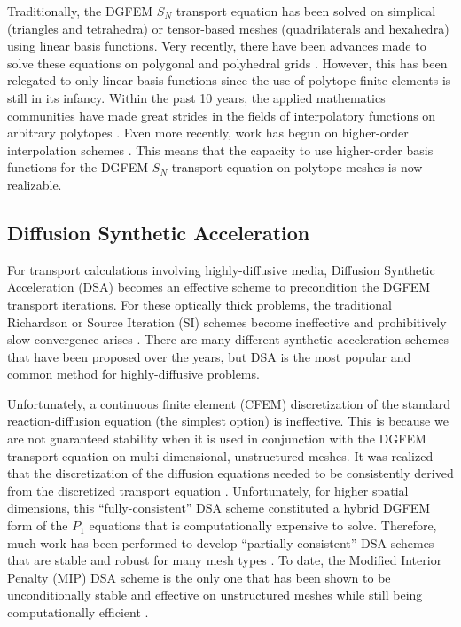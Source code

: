 Traditionally, the DGFEM $S_N$ transport equation has been solved on simplical (triangles and tetrahedra) or tensor-based meshes (quadrilaterals and hexahedra) using linear basis functions. Very recently, there have been advances made to solve these equations on polygonal and polyhedral grids \cite{davidson2008finite,ref::PWLD_stone_adams,ref::PWLD_stone_adams_unstructured,bailey2008phd}. However, this has been relegated to only linear basis functions since the use of polytope finite elements is still in its infancy. Within the past 10 years, the applied mathematics communities have made great strides in the fields of interpolatory functions on arbitrary polytopes \cite{sukumar2006recent}. Even more recently, work has begun on higher-order interpolation schemes \cite{rand2013interpolation}. This means that the capacity to use higher-order basis functions for the DGFEM $S_N$ transport equation on polytope meshes is now realizable. 

\subsection{Diffusion Synthetic Acceleration}
\label{sec::Intro_Past_DSA}

For transport calculations involving highly-diffusive media, Diffusion Synthetic Acceleration (DSA) becomes an effective scheme to precondition the DGFEM transport iterations. For these optically thick problems, the traditional Richardson or Source Iteration (SI) schemes become ineffective and prohibitively slow convergence arises \cite{ref::adams_larsen_iter_methods}. There are many different synthetic acceleration schemes that have been proposed over the years, but DSA is the most popular and common method for highly-diffusive problems.

Unfortunately, a continuous finite element (CFEM) discretization of the standard reaction-diffusion equation (the simplest option) is ineffective. This is because we are not guaranteed stability when it is used in conjunction with the DGFEM transport equation on multi-dimensional, unstructured meshes. It was realized that the discretization of the diffusion equations needed to be consistently derived from the discretized transport equation \cite{alcouffe1976stable,alcouffe1977DSA,larsen1982unconditionally_I,larsen1982unconditionally_II,warsa2002fully}. Unfortunately, for higher spatial dimensions, this ``fully-consistent'' DSA scheme constituted a hybrid DGFEM form of the $P_1$ equations that is computationally expensive to solve. Therefore, much work has been performed to develop ``partially-consistent'' DSA schemes that are stable and robust for many mesh types \cite{ref::dsa_DFEM_adams_martin,wareing1991diffusion,ref::DSA_wang_ragusa}. To date, the Modified Interior Penalty (MIP) DSA scheme is the only one that has been shown to be unconditionally stable and effective on unstructured meshes while still being computationally efficient \cite{ref::DSA_wang_ragusa,turcksin2014discontinuous}.

